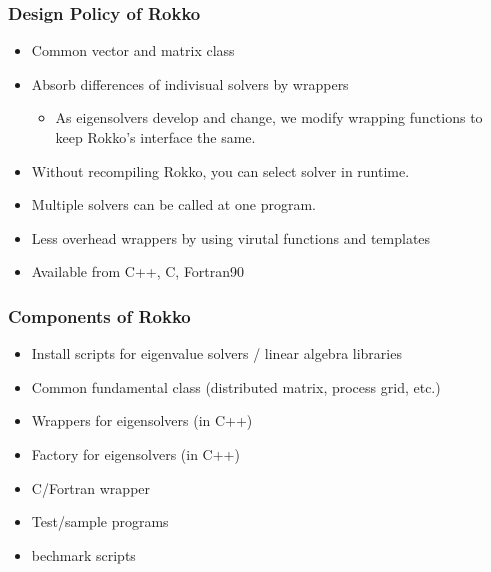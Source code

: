 \begin{frame}
  \frametitle{Design Policy of Rokko}
  \begin{itemize}
    \setlength{\itemsep}{1em}
  \item Common vector and matrix class
  \item Absorb differences of indivisual solvers by wrappers
    \begin{itemize}
    \item As eigensolvers develop and change, we modify wrapping functions to keep Rokko's interface the same.
    \end{itemize}
  \item Without recompiling Rokko, you can select solver in runtime.
  \item Multiple solvers can be called at one program.
  \item Less overhead wrappers by using virutal functions and templates
  \item Available from C++, C, Fortran90
  \end{itemize}
\end{frame}

\begin{frame}
  \frametitle{Components of Rokko}
  \begin{itemize}
  \item Install scripts for eigenvalue solvers / linear algebra libraries
  \item Common fundamental class (distributed matrix, process grid, etc.)
  \item Wrappers for eigensolvers (in C++)
  \item Factory for eigensolvers (in C++)
  \item C/Fortran wrapper
  \item Test/sample programs
  \item bechmark scripts
  \end{itemize}
\end{frame}

